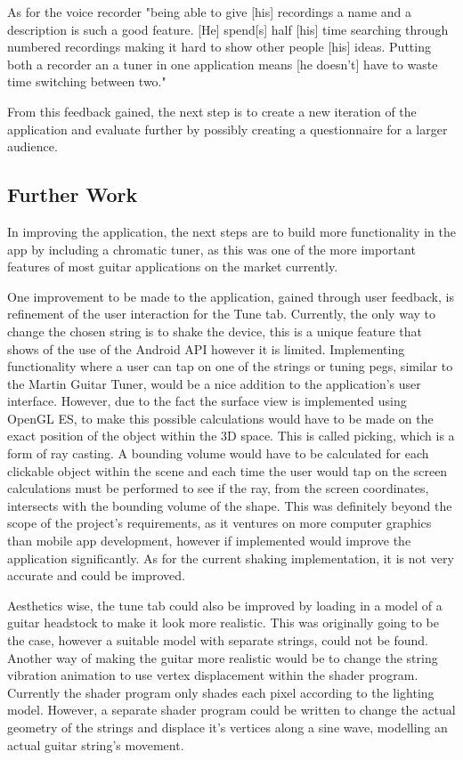 \documentclass[conference]{acmsiggraph}
\begin{document}
As for the voice recorder "being able to give [his] recordings a name and a description is such a good feature. [He] spend[s] half [his] time searching through numbered recordings making it hard to show other people [his] ideas. Putting both a recorder an a tuner in one application means [he doesn't] have to waste time switching between two." 

From this feedback gained, the next step is to create a new iteration of the application and evaluate further by possibly creating a questionnaire for a larger audience.

\subsection{Further Work}

In improving the application, the next steps are to build more functionality in the app by including a chromatic tuner, as this was one of the more important features of most guitar applications on the market currently.

One improvement to be made to the application, gained through user feedback, is refinement of the user interaction for the Tune tab. Currently, the only way to change the chosen string is to shake the device, this is a unique feature that shows of the use of the Android API however it is limited. Implementing functionality where a user can tap on one of the strings or tuning pegs, similar to the Martin Guitar Tuner, would be a nice addition to the application's user interface. However, due to the fact the surface view is implemented using OpenGL ES, to make this possible calculations would have to be made on the exact position of the object within the 3D space. This is called picking, which is a form of ray casting. \cite{ray} A bounding volume would have to be calculated for each clickable object within the scene and each time the user would tap on the screen calculations must be performed to see if the ray, from the screen coordinates, intersects with the bounding volume of the shape. This was definitely beyond the scope of the project's requirements, as it ventures on more computer graphics than mobile app development, however if implemented would improve the application significantly. As for the current shaking implementation, it is not very accurate and could be improved.

Aesthetics wise, the tune tab could also be improved by loading in a model of a guitar headstock to make it look more realistic. This was originally going to be the case, however a suitable model with separate strings, could not be found. Another way of making the guitar more realistic would be to change the string vibration animation to use vertex displacement within the shader program. Currently the shader program only shades each pixel according to the lighting model. However, a separate shader program could be written to change the actual geometry of the strings and displace it's vertices along a sine wave, modelling an actual guitar string's movement.
\end{document}
